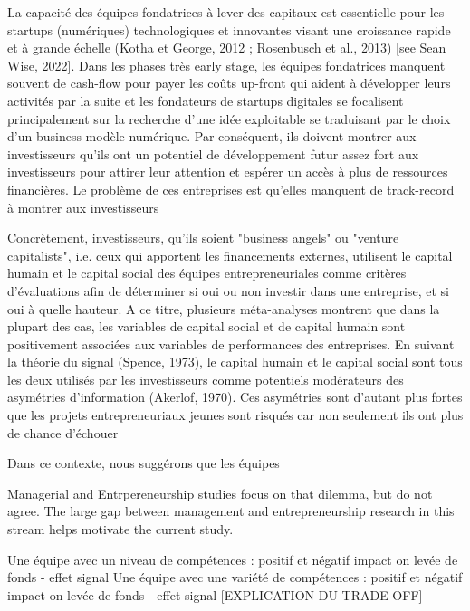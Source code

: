 \documentclass[12pt]{article}
\begin{document}
La capacité des équipes fondatrices à lever des capitaux est essentielle pour les startups (numériques) technologiques et innovantes visant une croissance rapide et à grande échelle (Kotha et George, 2012 ; Rosenbusch et al., 2013) [see Sean Wise, 2022]. Dans les phases très early stage, les équipes fondatrices manquent souvent de cash-flow pour payer les coûts up-front qui aident à développer leurs activités par la suite \citep{ratzinger2018impact} et les fondateurs de startups digitales se focalisent principalement sur la recherche d'une idée exploitable se traduisant par le choix d'un business modèle numérique. Par conséquent, ils doivent montrer aux investisseurs qu'ils ont un potentiel de développement futur assez fort aux investisseurs pour attirer leur attention et espérer un accès à plus de ressources financières. Le problème de ces entreprises est qu'elles manquent de track-record à montrer aux investisseurs

Concrètement, investisseurs, qu'ils soient "business angels" ou "venture capitalists", i.e. ceux qui apportent les financements externes, utilisent le capital humain et le capital social des équipes entrepreneuriales comme critères d'évaluations afin de déterminer si oui ou non investir dans une entreprise, et si oui à quelle hauteur. A ce titre, plusieurs méta-analyses montrent que dans la plupart des cas, les variables de capital social et de capital humain sont positivement associées aux variables de performances des entreprises. En suivant la théorie du signal (Spence, 1973), le capital humain et le capital social sont tous les deux utilisés par les investisseurs comme potentiels modérateurs des asymétries d'information (Akerlof, 1970). Ces asymétries sont d'autant plus fortes que les projets entrepreneuriaux jeunes sont risqués car non seulement ils ont plus de chance d'échouer

Dans ce contexte, nous suggérons que les équipes








Managerial and Entrpereneurship studies focus on that dilemma, but do not agree. The large gap between management and entrepreneurship research in this stream helps motivate the current study.

Une équipe avec un niveau de compétences : positif et négatif impact on levée de fonds - effet signal
Une équipe avec une variété de compétences : positif et négatif impact on levée de fonds - effet signal
[EXPLICATION DU TRADE OFF]
\end{document}
